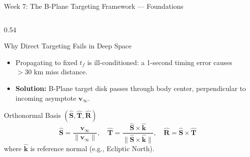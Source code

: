 \documentclass[aspectratio=169, 10pt]{beamer}
\begin{document}
\begin{frame}{Week 7: The B-Plane Targeting Framework --- Foundations}
    \begin{columns}[t]
        \begin{column}{0.54\textwidth}
            \begin{block}{Why Direct Targeting Fails in Deep Space}
                \scriptsize
                \begin{itemize}\setlength{\itemsep}{1pt}
                    \item Propagating to fixed $t_f$ is ill-conditioned: a 1-second timing error causes $>30\text{ km}$ miss distance.
                    \item \textbf{Solution:} B-Plane target disk passes through body center, perpendicular to incoming asymptote $\mathbf{v}_\infty$.
                \end{itemize}
            \end{block}
            \begin{block}{Orthonormal Basis $(\hat{\mathbf{S}}, \hat{\mathbf{T}}, \hat{\mathbf{R}})$}
                \scriptsize
                \begin{equation*}
                    \hat{\mathbf{S}} = \frac{\mathbf{v}_\infty}{\|\mathbf{v}_\infty\|}, \quad
                    \hat{\mathbf{T}} = \frac{\hat{\mathbf{S}} \times \hat{\mathbf{k}}}{\|\hat{\mathbf{S}} \times \hat{\mathbf{k}}\|}, \quad
                    \hat{\mathbf{R}} = \hat{\mathbf{S}} \times \hat{\mathbf{T}}
                \end{equation*}
                where $\hat{\mathbf{k}}$ is reference normal (e.g., Ecliptic North).
            \end{block}
        \end{column}


\end{columns}
\end{frame}
\end{document}
